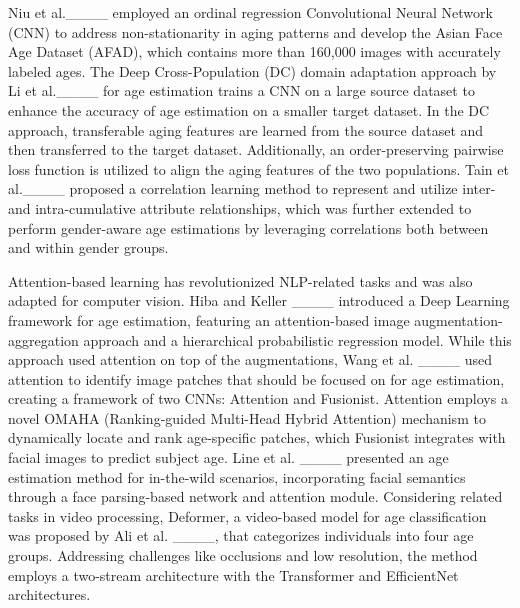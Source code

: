 Niu et al.____ employed an ordinal regression Convolutional Neural
Network (CNN) to address non-stationarity in aging patterns and develop the
Asian Face Age Dataset (AFAD), which contains more than 160,000 images with
accurately labeled ages. The Deep Cross-Population (DC) domain adaptation
approach by Li et al.____ for age estimation trains a CNN on a
large source dataset to enhance the accuracy of age estimation on a smaller
target dataset. In the DC approach, transferable aging features are learned
from the source dataset and then transferred to the target dataset.
Additionally, an order-preserving pairwise loss function is utilized to align
the aging features of the two populations. Tain et al.____
proposed a correlation learning method to represent and utilize inter- and
intra-cumulative attribute relationships, which was further extended to
perform gender-aware age estimations by leveraging correlations both between
and within gender groups.

Attention-based learning has revolutionized NLP-related tasks and was also
adapted for computer vision. Hiba and Keller ____ introduced a Deep
Learning framework for age estimation, featuring an attention-based image
augmentation-aggregation approach and a hierarchical probabilistic regression
model. While this approach used attention on top of the augmentations, Wang et
al. ____ used attention to identify image patches that should be
focused on for age estimation, creating a framework of two CNNs: Attention and
Fusionist. Attention employs a novel OMAHA (Ranking-guided Multi-Head Hybrid
Attention) mechanism to dynamically locate and rank age-specific patches,
which Fusionist integrates with facial images to predict subject age. Line et
al. ____ presented an age estimation method for in-the-wild
scenarios, incorporating facial semantics through a face parsing-based network
and attention module. Considering related tasks in video processing, Deformer,
a video-based model for age classification was proposed by Ali et al.
____, that categorizes individuals into four age groups.
Addressing challenges like occlusions and low resolution, the method employs a
two-stream architecture with the Transformer and EfficientNet architectures.

